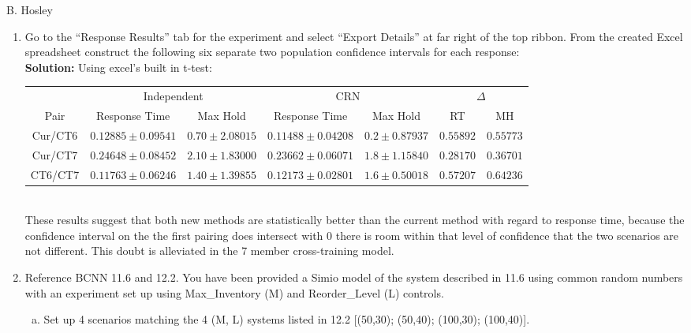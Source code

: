 \documentclass[12pt]{amsart}
\begin{document}
\raggedbottom

\hspace{\fill} {\large B. Hosley}
\bigskip


\begin{enumerate}[1.]
	\item Go to the “Response Results” tab for the experiment and select “Export Details” at far
	right of the top ribbon. From the created Excel spreadsheet construct the following six
	separate two population confidence intervals for each response: \\
	
	\textbf{Solution:} Using excel's built in t-test:\bigskip\\
	\begin{tabular}{c|cc|cc|cc} 
		\toprule 
		& \multicolumn{2}{|c}{Independent} & \multicolumn{2}{|c}{CRN} & \multicolumn{2}{|c}{\(\Delta\)} \\
		Pair & Response Time & Max Hold & Response Time & Max Hold & RT & MH \\
		\midrule
		Cur/CT6 & \(0.12885\pm0.09541\) & \(0.70\pm2.08015\) & \(0.11488\pm0.04208\) & \(0.2\pm0.87937\) & \(0.55892\) & \(0.55773\) \\ [3pt]
		Cur/CT7 & \(0.24648\pm0.08452\) & \(2.10\pm1.83000\) & \(0.23662\pm0.06071\) & \(1.8\pm1.15840\) & \(0.28170\) & \(0.36701\) \\ [3pt]
		CT6/CT7 & \(0.11763\pm0.06246\) & \(1.40\pm1.39855\) & \(0.12173\pm0.02801\) & \(1.6\pm0.50018\) & \(0.57207\) & \(0.64236\) \\ [3pt]
		\bottomrule
	\end{tabular}\bigskip\\
	These results suggest that both new methods are statistically better than the current method with regard to response time,
	because the confidence interval on the the first pairing does intersect with 0 there is room within that level of confidence
	that the two scenarios are not different. This doubt is alleviated in the 7 member cross-training model. \\

	\item Reference BCNN 11.6 and 12.2. You have been provided a Simio model of the system
	described in 11.6 using common random numbers with an experiment set up using
	Max\_Inventory (M) and Reorder\_Level (L) controls.
	\begin{enumerate}[a.]
		\item Set up 4 scenarios matching the 4 (M, L) systems listed in 12.2 [(50,30); (50,40);
		(100,30); (100,40)].
		

\end{enumerate}
\end{enumerate}
\end{document}
